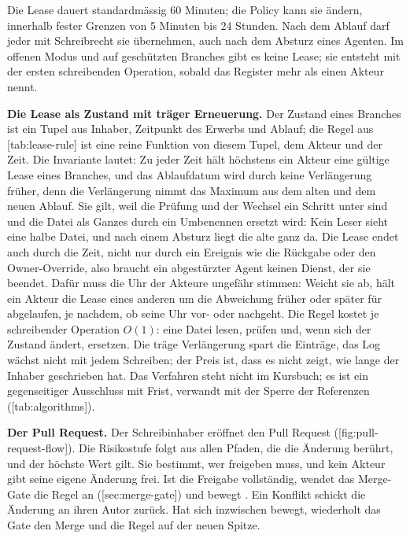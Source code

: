 Die Lease dauert standardmässig 60 Minuten; die Policy kann sie ändern, innerhalb fester Grenzen
von 5 Minuten bis 24 Stunden.
Nach dem Ablauf darf jeder mit Schreibrecht sie übernehmen, auch nach dem Absturz eines Agenten.
Im offenen Modus und auf geschützten Branches gibt es keine Lease;
sie entsteht mit der ersten schreibenden Operation, sobald das Register mehr als einen Akteur nennt.

\startplacefigure[title={Zeitachse einer Branch-Lease},
    reference=fig:branch-lease,location=here]
\stopplacefigure

{\bf Die Lease als Zustand mit träger Erneuerung.}
Der Zustand eines Branches ist ein Tupel aus Inhaber, Zeitpunkt des Erwerbs und Ablauf;
die Regel aus [tab:lease-rule] ist eine reine Funktion von diesem Tupel,
dem Akteur und der Zeit.
Die Invariante lautet: Zu jeder Zeit hält höchstens ein Akteur eine gültige Lease eines Branches,
und das Ablaufdatum wird durch keine Verlängerung früher, denn die Verlängerung nimmt das
Maximum aus dem alten und dem neuen Ablauf.
Sie gilt, weil die Prüfung und der Wechsel ein Schritt unter  sind
und die Datei als Ganzes durch ein Umbenennen ersetzt wird:
Kein Leser sieht eine halbe Datei, und nach einem Absturz liegt die alte ganz da.
Die Lease endet auch durch die Zeit, nicht nur durch ein Ereignis wie die Rückgabe oder den
Owner-Override, also braucht ein abgestürzter Agent keinen Dienst, der sie beendet.
Dafür muss die Uhr der Akteure ungefähr stimmen:
Weicht sie ab, hält ein Akteur die Lease eines anderen um die Abweichung früher oder später
für abgelaufen, je nachdem, ob seine Uhr vor- oder nachgeht.
Die Regel kostet je schreibender Operation $O(1)$: eine Datei lesen, prüfen und, wenn sich der
Zustand ändert, ersetzen.
Die träge Verlängerung spart die Einträge, das Log wächst nicht mit jedem Schreiben;
der Preis ist, dass es nicht zeigt, wie lange der Inhaber geschrieben hat.
Das Verfahren steht nicht im Kursbuch; es ist ein gegenseitiger Ausschluss mit Frist, verwandt
mit der Sperre der Referenzen ([tab:algorithms]).

{\bf Der Pull Request.}
Der Schreibinhaber eröffnet den Pull Request ([fig:pull-request-flow]).
Die Risikostufe folgt aus allen Pfaden, die die Änderung berührt, und der höchste Wert gilt.
Sie bestimmt, wer freigeben muss, und kein Akteur gibt seine eigene Änderung frei.
Ist die Freigabe vollständig, wendet das Merge-Gate die Regel an ([sec:merge-gate])
und bewegt .
Ein Konflikt schickt die Änderung an ihren Autor zurück.
Hat sich  inzwischen bewegt, wiederholt das Gate den Merge und die Regel
auf der neuen Spitze.

